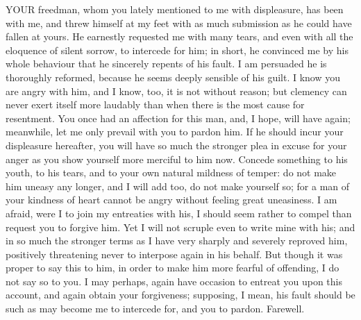 
YOUR freedman, whom you lately mentioned to me with displeasure, has been
with me, and threw himself at my feet with as much submission as he could
have fallen at yours. He earnestly requested me with many tears, and even
with all the eloquence of silent sorrow, to intercede for him; in short,
he convinced me by his whole behaviour that he sincerely repents of his
fault. I am persuaded he is thoroughly reformed, because he seems deeply
sensible of his guilt. I know you are angry with him, and I know, too, it
is not without reason; but clemency can never exert itself more laudably
than when there is the most cause for resentment. You once had an
affection for this man, and, I hope, will have again; meanwhile, let me
only prevail with you to pardon him. If he should incur your displeasure
hereafter, you will have so much the stronger plea in excuse for your
anger as you show yourself more merciful to him now. Concede something to
his youth, to his tears, and to your own natural mildness of temper: do
not make him uneasy any longer, and I will add too, do not make yourself
so; for a man of your kindness of heart cannot be angry without feeling
great uneasiness. I am afraid, were I to join my entreaties with his, I
should seem rather to compel than request you to forgive him. Yet I will
not scruple even to write mine with his; and in so much the stronger terms
as I have very sharply and severely reproved him, positively threatening
never to interpose again in his behalf. But though it was proper to say
this to him, in order to make him more fearful of offending, I do not say
so to you. I may perhaps, again have occasion to entreat you upon this
account, and again obtain your forgiveness; supposing, I mean, his fault
should be such as may become me to intercede for, and you to pardon.
Farewell.


